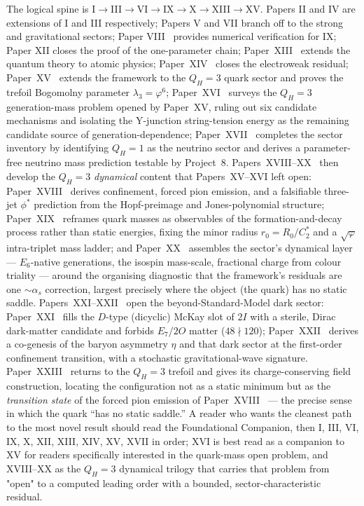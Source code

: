 \documentclass[11pt,a4paper]{article}
\newcommand{\vp}{\varphi}
\begin{document}
The logical spine is I$\to$III$\to$VI$\to$IX$\to$X$\to$XIII$\to$XV. Papers II and IV are
extensions of I and III respectively; Papers V and VII branch off to the
strong and gravitational sectors; Paper VIII~\cite{Paper8} provides numerical verification for IX;
Paper XII closes the proof of the one-parameter chain;
Paper~XIII~\cite{Paper13} extends the quantum theory to atomic physics;
Paper~XIV~\cite{Paper14} closes the electroweak residual;
Paper~XV~\cite{Paper15} extends the framework to the $Q_H=3$ quark sector
and proves the trefoil Bogomolny parameter $\lambda_3=\vp^6$;
Paper~XVI~\cite{Paper16} surveys the $Q_H=3$ generation-mass problem opened
by Paper~XV, ruling out six candidate mechanisms and isolating the
Y-junction string-tension energy as the remaining candidate source of
generation-dependence;
Paper~XVII~\cite{Paper17} completes the sector inventory by identifying
$Q_H=1$ as the neutrino sector and derives a parameter-free neutrino mass
prediction testable by Project~8.
Papers~XVIII--XX~\cite{Paper18,Paper19,Paper20} then develop the $Q_H=3$
\emph{dynamical} content that Papers~XV--XVI left open:
Paper~XVIII~\cite{Paper18} derives confinement, forced pion emission, and a
falsifiable three-jet $\phi^*$ prediction from the Hopf-preimage and
Jones-polynomial structure;
Paper~XIX~\cite{Paper19} reframes quark masses as observables of the
formation-and-decay process rather than static energies, fixing the minor
radius $r_0=R_0/C_2^*$ and a $\sqrt\vp$ intra-triplet mass ladder;
and Paper~XX~\cite{Paper20} assembles the sector's dynamical layer ---
$E_6$-native generations, the isospin mass-scale, fractional charge from
colour triality --- around the organising diagnostic that the framework's
residuals are one $\sim\alpha_s$ correction, largest precisely where the
object (the quark) has no static saddle.
Papers~XXI--XXII~\cite{Paper21,Paper22} open the beyond-Standard-Model dark
sector: Paper~XXI~\cite{Paper21} fills the $D$-type (dicyclic) McKay slot of
$2I$ with a sterile, Dirac dark-matter candidate and forbids $E_7$/$2O$ matter
($48\nmid120$); Paper~XXII~\cite{Paper22} derives a co-genesis of the baryon
asymmetry $\eta$ and that dark sector at the first-order confinement
transition, with a stochastic gravitational-wave signature.
Paper~XXIII~\cite{Paper23} returns to the $Q_H=3$ trefoil and gives its
charge-conserving field construction, locating the configuration not as a
static minimum but as the \emph{transition state} of the forced pion emission
of Paper~XVIII~\cite{Paper18} --- the precise sense in which the quark ``has no
static saddle.''
A reader who wants the cleanest path to the most novel result should read the
Foundational Companion, then I, III, VI, IX, X, XII, XIII, XIV, XV, XVII in order;
XVI is best read as a companion to XV for readers specifically interested in
the quark-mass open problem, and XVIII--XX as the $Q_H=3$ dynamical trilogy that
carries that problem from "open" to a computed leading order with a bounded,
sector-characteristic residual.
\end{document}
